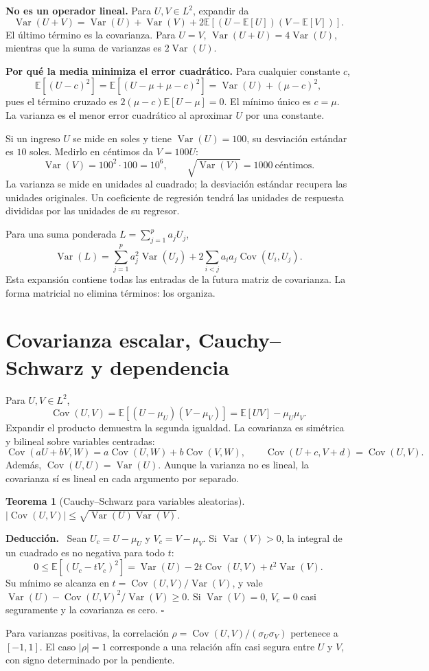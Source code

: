 \documentclass[11pt,a4paper]{article}
\newcommand{\E}{\mathbb E}
\newcommand{\abs}[1]{\left\lvert #1\right\rvert}
\DeclareMathOperator{\Var}{Var}
\DeclareMathOperator{\Cov}{Cov}
\newcommand{\topic}[2]{\clearpage\section{#1}\label{#2}}
\newenvironment{deduccion}{\par\textbf{Deducción.}\ }{\hfill$\square$\par}
\newtheorem{teorema}{Teorema}[section]
\theoremstyle{definition}\newtheorem{definicion}[teorema]{Definición}
\begin{document}
\textbf{No es un operador lineal.} Para $U,V\in L^2$, expandir da
\[
\Var(U+V)
=\Var(U)+\Var(V)+2\E[(U-\E[U])(V-\E[V])].
\]
El último término es la covarianza. Para $U=V$,
$\Var(U+U)=4\Var(U)$, mientras que la suma de varianzas es $2\Var(U)$.

\textbf{Por qué la media minimiza el error cuadrático.}
Para cualquier constante $c$,
\[
\E[(U-c)^2]
=\E[(U-\mu+\mu-c)^2]
=\Var(U)+(\mu-c)^2,
\]
pues el término cruzado es $2(\mu-c)\E[U-\mu]=0$.
El mínimo único es $c=\mu$. La varianza es el menor error cuadrático
al aproximar $U$ por una constante.

\begin{ejemplo}
Si un ingreso $U$ se mide en soles y tiene $\Var(U)=100$, su desviación
estándar es $10$ soles. Medirlo en céntimos da $V=100U$:
\[
\Var(V)=100^2\cdot100=10^6,\qquad
\sqrt{\Var(V)}=1000\ \text{céntimos}.
\]
La varianza se mide en unidades al cuadrado; la desviación estándar recupera
las unidades originales. Un coeficiente de regresión tendrá las unidades de
respuesta divididas por las unidades de su regresor.
\end{ejemplo}
Para una suma ponderada $L=\sum_{j=1}^pa_jU_j$,
\[
\Var(L)=\sum_{j=1}^pa_j^2\Var(U_j)
+2\sum_{i<j}a_ia_j\Cov(U_i,U_j).
\]
Esta expansión contiene todas las entradas de la futura matriz de
covarianza. La forma matricial no elimina términos: los organiza.

\topic{Covarianza escalar, Cauchy--Schwarz y dependencia}{s09}
Para $U,V\in L^2$,
\[
\Cov(U,V)=\E[(U-\mu_U)(V-\mu_V)]
=\E[UV]-\mu_U\mu_V.
\]
Expandir el producto demuestra la segunda igualdad.
La covarianza es simétrica y bilineal sobre variables centradas:
\[
\Cov(aU+bV,W)=a\Cov(U,W)+b\Cov(V,W),\qquad
\Cov(U+c,V+d)=\Cov(U,V).
\]
Además, $\Cov(U,U)=\Var(U)$. Aunque la varianza no es lineal,
la covarianza sí es lineal en cada argumento por separado.

\begin{teorema}[Cauchy--Schwarz para variables aleatorias]
$\abs{\Cov(U,V)}\le\sqrt{\Var(U)\Var(V)}$.
\end{teorema}
\begin{deduccion}
Sean $U_c=U-\mu_U$ y $V_c=V-\mu_V$. Si $\Var(V)>0$, la integral
de un cuadrado es no negativa para todo $t$:
\[
0\le\E[(U_c-tV_c)^2]
=\Var(U)-2t\Cov(U,V)+t^2\Var(V).
\]
Su mínimo se alcanza en $t=\Cov(U,V)/\Var(V)$, y vale
$\Var(U)-\Cov(U,V)^2/\Var(V)\ge0$.
Si $\Var(V)=0$, $V_c=0$ casi seguramente y la covarianza es cero.
\end{deduccion}
Para varianzas positivas, la correlación
$\rho=\Cov(U,V)/(\sigma_U\sigma_V)$ pertenece a $[-1,1]$.
El caso $\abs\rho=1$ corresponde a una relación afín casi segura entre
$U$ y $V$, con signo determinado por la pendiente.
\end{document}
